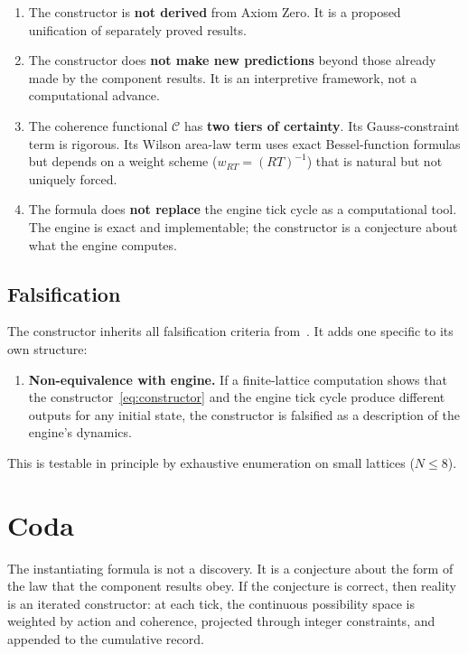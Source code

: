 \documentclass[11pt,a4paper]{article}
\theoremstyle{compact}
\begin{document}
\begin{enumerate}[nosep]
\item The constructor is \textbf{not derived} from Axiom Zero. It is a proposed unification of separately proved results.
\item The constructor does \textbf{not make new predictions} beyond those already made by the component results. It is an interpretive framework, not a computational advance.
\item The coherence functional $\mathcal{C}$ has \textbf{two tiers of certainty}. Its Gauss-constraint term is rigorous. Its Wilson area-law term uses exact Bessel-function formulas but depends on a weight scheme ($w_{RT} = (RT)^{-1}$) that is natural but not uniquely forced.
\item The formula does \textbf{not replace} the engine tick cycle as a computational tool. The engine is exact and implementable; the constructor is a conjecture about what the engine computes.
\end{enumerate}

\subsection*{Falsification}

The constructor inherits all falsification criteria from~\cite{lifecycle}. It adds one specific to its own structure:

\begin{enumerate}[nosep]
\item[\textbf{F7.}] \textbf{Non-equivalence with engine.} If a finite-lattice computation shows that the constructor~\eqref{eq:constructor} and the engine tick cycle produce different outputs for any initial state, the constructor is falsified as a description of the engine's dynamics.
\end{enumerate}

This is testable in principle by exhaustive enumeration on small lattices ($N \leq 8$).


\section*{Coda}

The instantiating formula is not a discovery. It is a conjecture about the form of the law that the component results obey. If the conjecture is correct, then reality is an iterated constructor: at each tick, the continuous possibility space is weighted by action and coherence, projected through integer constraints, and appended to the cumulative record.
\end{document}
